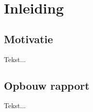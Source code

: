 \chapter[Inleiding]{Inleiding} \label {chapter:inleiding}

	\section{Motivatie}
		Tekst...
	
	\section{Opbouw rapport}
		Tekst...